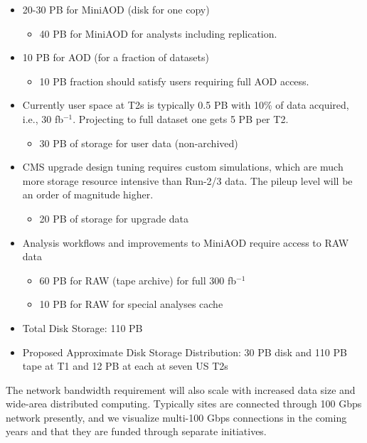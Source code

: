 \documentclass[11pt,a4paper]{article}
\begin{document}
\begin{itemize}
\item 20-30 PB for MiniAOD (disk for one copy)
\begin{itemize}
\item 40 PB for MiniAOD for analysts including replication.
\end{itemize}
\item 10 PB for AOD (for a fraction of datasets)
\begin{itemize}
\item 10 PB fraction should satisfy users requiring full AOD access.
\end{itemize}
\item Currently user space at T2s is typically 0.5 PB with 10\% of data acquired, i.e., 30 fb$^{-1}$.
Projecting to full dataset one gets 5 PB per T2.
\begin{itemize} 
\item 30 PB of storage for user data (non-archived)
\end{itemize}
\item CMS upgrade design tuning requires custom simulations, which are much more
storage resource intensive than Run-2/3 data.  The pileup level will be an order of
magnitude higher.
\begin{itemize} 
\item 20 PB of storage for upgrade data
\end{itemize} 
\item Analysis workflows and improvements to MiniAOD require access to RAW data
\begin{itemize}
\item 60 PB for RAW (tape archive) for full 300 fb$^{-1}$
\end{itemize} 
\begin{itemize}
\item 10 PB for RAW for special analyses cache
\end{itemize}
\item Total Disk Storage:  110 PB
\item Proposed Approximate Disk Storage Distribution: 30 PB disk and 110 PB tape at T1 and 12 PB at each at seven US T2s
\end{itemize}


The network bandwidth requirement will also scale with increased data
size and wide-area distributed computing.  Typically sites are
connected through 100 Gbps network presently, and we visualize
multi-100 Gbps connections in the coming years and that they are
funded through separate initiatives.
\end{document}
